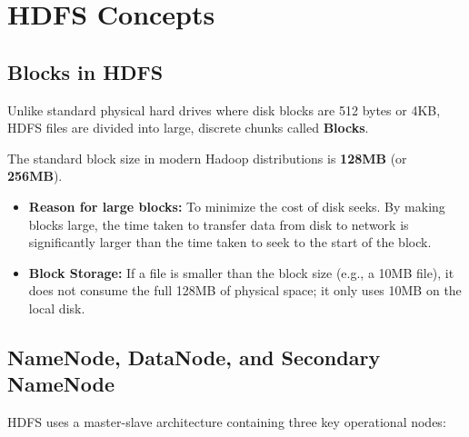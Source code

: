 \documentclass[12pt,a4paper]{article}
\begin{document}
\section{HDFS Concepts}

\subsection{Blocks in HDFS}
Unlike standard physical hard drives where disk blocks are 512 bytes or 4KB, HDFS files are divided into large, discrete chunks called \textbf{Blocks}.

\begin{tcolorbox}[formulabox, title={HDFS Block Size Properties}]
  The standard block size in modern Hadoop distributions is \textbf{128MB} (or \textbf{256MB}).
  \begin{itemize}[leftmargin=*, noitemsep]
    \item \textbf{Reason for large blocks:} To minimize the cost of disk seeks. By making blocks large, the time taken to transfer data from disk to network is significantly larger than the time taken to seek to the start of the block.
    \item \textbf{Block Storage:} If a file is smaller than the block size (e.g., a 10MB file), it does not consume the full 128MB of physical space; it only uses 10MB on the local disk.
  \end{itemize}
\end{tcolorbox}

\subsection{NameNode, DataNode, and Secondary NameNode}
HDFS uses a master-slave architecture containing three key operational nodes:
\end{document}
